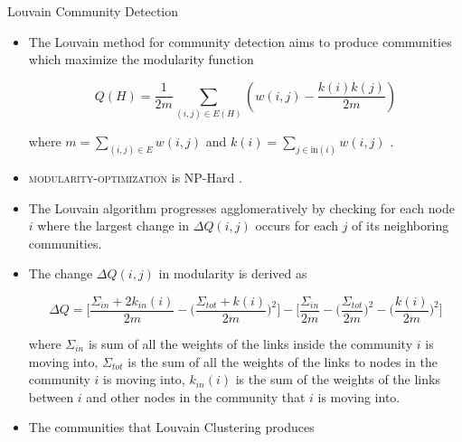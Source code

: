 \documentclass{beamer}
\begin{document}
\begin{frame}[allowframebreaks]{Louvain Community Detection}

\begin{itemize}
    \item<1-> The Louvain method for community detection aims to produce communities which maximize the modularity function 
    
    $$Q(H) = \frac {1}{2m} \sum_{(i, j) \in E(H)} \left ( w(i, j) - \frac {k(i) k(j)} {2m} \right )$$
    
    where $m = \sum_{(i, j) \in E} w(i,j)$ and $k(i) = \sum_{j \in \mathrm{in}(i)} w(i, j)$ . 
    
    \item<2-> \textsc{modularity-optimization} is NP-Hard \cite{modularity}.
    \item<3-> The Louvain algorithm progresses agglomeratively by checking for each node $i$ where the largest change in $\Delta Q (i, j) $ occurs for each $j$ of its neighboring communities. 
    \framebreak
    
    \item<4-> The change $\Delta Q(i, j)$ in modularity is derived as 
        
    \small {
    $$ \Delta Q = \bigg[ \frac{\Sigma_{in} + 2k_{in} (i)}{2m} - \bigg(\frac{\Sigma_{tot} + k(i)}{2m}\bigg)^2 \bigg]-\bigg[\frac{\Sigma_{in}}{2m} - \bigg(\frac{\Sigma_{tot}}{2m}\bigg)^2-\bigg(\frac{k(i)}{2m}\bigg)^2\bigg] $$
    }
        
    
    where $\Sigma_{in}$ is sum of all the weights of the links inside the community $i$ is moving into, $\Sigma_{tot}$ is the sum of all the weights of the links to nodes in the community $i$ is moving into, $k_{in} (i)$ is the sum of the weights of the links between $i$ and other nodes in the community that $i$ is  moving into.
    
    \item<5-> The communities that Louvain Clustering produces 
    
\end{itemize}

\end{frame}
\end{document}
